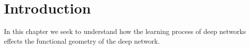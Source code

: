 \section{Introduction}

In this chapter we seek to understand how the learning process of deep networks effects the functional geometry of the deep network.